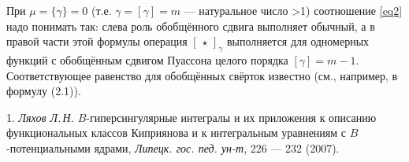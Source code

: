  При $\mu=\{\gamma\}=0$ (т.е. $\gamma=[\gamma]=m$ --- натуральное число >1) соотношение \eqref{eq2} надо понимать так:
 слева роль обобщённого сдвига выполняет обычный,
 а в правой части этой формулы операция $[\,\star\,]_\gamma$
 выполняется для одномерных функций с обобщённым сдвигом Пуассона целого порядка $[\gamma]=m-1$.
 Соответствующее равенство для обобщённых свёрток известно   (см., например,  в \cite{lit-ra3} формулу (2.1)).

\litlist

1. {\it Ляхов Л.\,Н.} $B$-гиперсингулярные интегралы и их приложения к описанию функциональных классов Киприянова и к интегральным уравнениям с $B$-потенциальными ядрами,  {\it Липецк. гос. пед. ун-т}, 226 --- 232 (2007).


